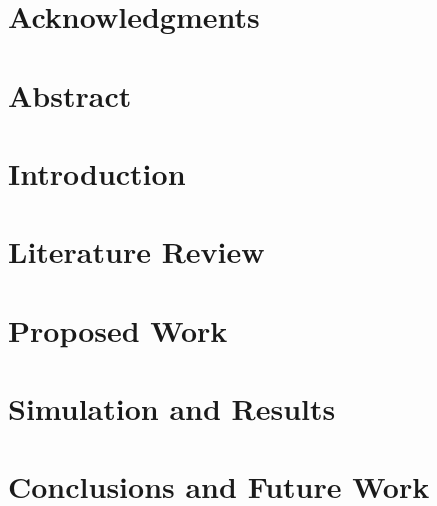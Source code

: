 \documentclass[a4paper, 11pt, oneside]{Dissertation}
\begin{document}
\sloppy
{}








\chapter*{Acknowledgments}
\label{ch:ack}


\chapter*{Abstract}
\label{ch:abstract}




\pagestyle{fancy}
\tableofcontents
\listoffigures
\listoftables
\newpage

\mainmatter	  

\chapter{Introduction}
\label{ch:intro}


\chapter{Literature Review}
\label{ch:literature}


\chapter{Proposed Work}
\label{ch:new}


\chapter{Simulation and Results}
\label{ch:result}


\chapter{Conclusions and Future Work}
\label{ch:conclude}


\newpage
{}
\small{{}}

\end{document}
